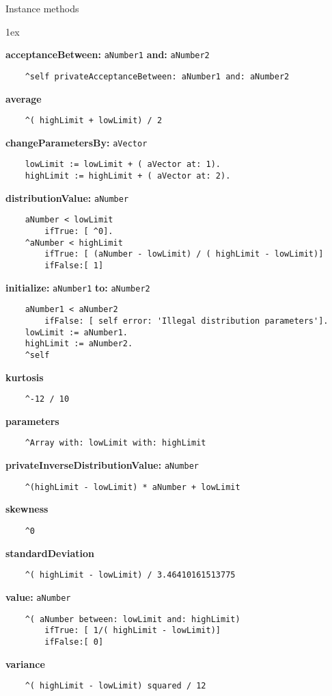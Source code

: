 Instance methods
{\parskip 1ex\par\noindent}
{\bf acceptanceBetween:} {\tt aNumber1} {\bf and:} {\tt aNumber2}
\begin{verbatim}
    ^self privateAcceptanceBetween: aNumber1 and: aNumber2

\end{verbatim}
{\bf average}
\begin{verbatim}
    ^( highLimit + lowLimit) / 2

\end{verbatim}
{\bf changeParametersBy:} {\tt aVector}
\begin{verbatim}
    lowLimit := lowLimit + ( aVector at: 1).
    highLimit := highLimit + ( aVector at: 2).

\end{verbatim}
{\bf distributionValue:} {\tt aNumber}
\begin{verbatim}
    aNumber < lowLimit
        ifTrue: [ ^0].
    ^aNumber < highLimit
        ifTrue: [ (aNumber - lowLimit) / ( highLimit - lowLimit)]
        ifFalse:[ 1]

\end{verbatim}
{\bf initialize:} {\tt aNumber1} {\bf to:} {\tt aNumber2}
\begin{verbatim}
    aNumber1 < aNumber2
        ifFalse: [ self error: 'Illegal distribution parameters'].
    lowLimit := aNumber1.
    highLimit := aNumber2.
    ^self

\end{verbatim}
{\bf kurtosis}
\begin{verbatim}
    ^-12 / 10

\end{verbatim}
{\bf parameters}
\begin{verbatim}
    ^Array with: lowLimit with: highLimit

\end{verbatim}
{\bf privateInverseDistributionValue:} {\tt aNumber}
\begin{verbatim}
    ^(highLimit - lowLimit) * aNumber + lowLimit

\end{verbatim}
{\bf skewness}
\begin{verbatim}
    ^0

\end{verbatim}
{\bf standardDeviation}
\begin{verbatim}
    ^( highLimit - lowLimit) / 3.46410161513775 

\end{verbatim}
{\bf value:} {\tt aNumber}
\begin{verbatim}
    ^( aNumber between: lowLimit and: highLimit)
        ifTrue: [ 1/( highLimit - lowLimit)]
        ifFalse:[ 0]

\end{verbatim}
{\bf variance}
\begin{verbatim}
    ^( highLimit - lowLimit) squared / 12

\end{verbatim}

